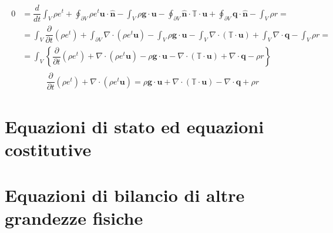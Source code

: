 \documentclass[letterpaper,10pt,english]{jupyterBook}
\begin{document}
\begin{equation*}
\begin{split}\begin{aligned}
0 & = \dfrac{d}{dt} \int_{V} \rho e^t + \oint_{\partial V} \rho e^t \mathbf{u} \cdot \mathbf{\hat{n}} - \int_{V} \rho \mathbf{g} \cdot \mathbf{u} - \oint_{\partial V} \mathbf{\hat{n}} \cdot \mathbb{T} \cdot \mathbf{u} + \oint_{\partial V} \mathbf{q} \cdot \mathbf{\hat{n}} - \int_{V} \rho r = \\
  & = \int_{V} \dfrac{\partial}{\partial t}  \left( \rho e^t \right) + \int_{\partial V} \nabla \cdot \left( \rho e^t \mathbf{u} \right) - \int_{V} \rho \mathbf{g} \cdot \mathbf{u} - \int_{V} \nabla \cdot \left( \mathbb{T} \cdot \mathbf{u} \right) + \int_{V} \nabla \cdot \mathbf{q} - \int_{V} \rho r = \\
  & = \int_{V} \left\{ \dfrac{\partial}{\partial t}  \left( \rho e^t \right) + \nabla \cdot \left( \rho e^t \mathbf{u} \right) - \rho \mathbf{g} \cdot \mathbf{u} - \nabla \cdot \left( \mathbb{T} \cdot \mathbf{u} \right) + \nabla \cdot \mathbf{q} - \rho r \right\} 
\end{aligned}\end{split}
\end{equation*}\begin{equation*}
\begin{split}
  \dfrac{\partial}{\partial t}  \left( \rho e^t \right) + \nabla \cdot \left( \rho e^t \mathbf{u} \right) = \rho \mathbf{g} \cdot \mathbf{u} + \nabla \cdot \left( \mathbb{T} \cdot \mathbf{u} \right) - \nabla \cdot \mathbf{q} + \rho r
\end{split}
\end{equation*}
\sphinxstepscope


\chapter{Equazioni di stato ed equazioni costitutive}
\label{\detokenize{ch/continuum/constitutive-equations:equazioni-di-stato-ed-equazioni-costitutive}}\label{\detokenize{ch/continuum/constitutive-equations:continuum-constitutive-equations}}\label{\detokenize{ch/continuum/constitutive-equations::doc}}
\sphinxstepscope


\chapter{Equazioni di bilancio di altre grandezze fisiche}
\label{\detokenize{ch/continuum/derived-balances:equazioni-di-bilancio-di-altre-grandezze-fisiche}}\label{\detokenize{ch/continuum/derived-balances:continuum-derived-balances}}\label{\detokenize{ch/continuum/derived-balances::doc}}
\end{document}
